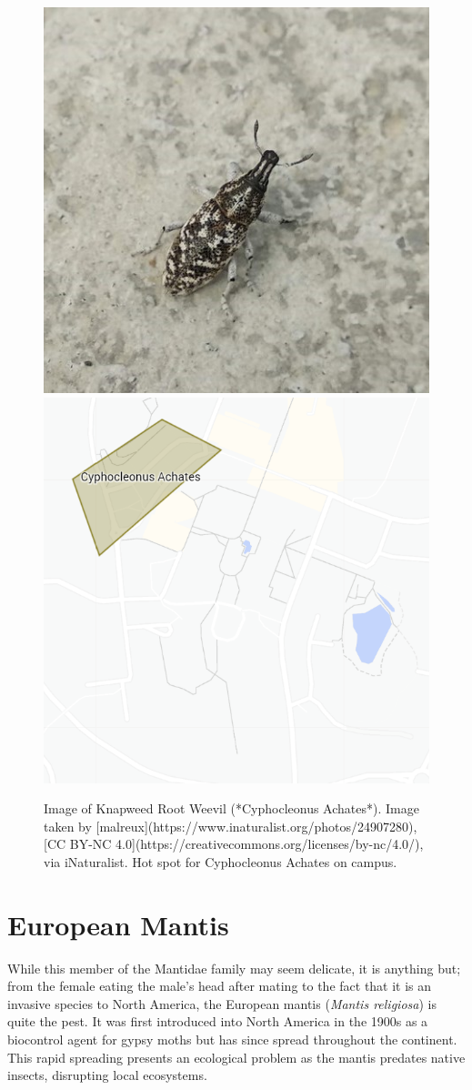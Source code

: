 \documentclass[
]{book}
\begin{document}
\begin{figure}

{\centering \includegraphics[width=0.49\linewidth,height=0.2\textheight]{insect_images/cyphocleonus_11} \includegraphics[width=0.49\linewidth,height=0.2\textheight]{insect_images/cyphocleonus_hotspot_11} 

}

\caption{Image of Knapweed Root Weevil (*Cyphocleonus Achates*). Image taken by [malreux](https://www.inaturalist.org/photos/24907280), [CC BY-NC 4.0](https://creativecommons.org/licenses/by-nc/4.0/), via iNaturalist. Hot spot for Cyphocleonus Achates on campus.}\label{fig:unnamed-chunk-6}
\end{figure}

\hypertarget{european-mantis}{%
\section{European Mantis}\label{european-mantis}}

While this member of the Mantidae family may seem delicate, it is anything but; from the female eating the male's head after mating to the fact that it is an invasive species to North America, the European mantis (\emph{Mantis religiosa}) is quite the pest. It was first introduced into North America in the 1900s as a biocontrol agent for gypsy moths but has since spread throughout the continent. This rapid spreading presents an ecological problem as the mantis predates native insects, disrupting local ecosystems.
\end{document}
